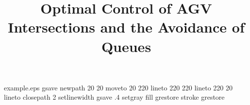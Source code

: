 %
%
%
%
%
\begin{filecontents*}{example.eps}
gsave
newpath
  20 20 moveto
  20 220 lineto
  220 220 lineto
  220 20 lineto
closepath
2 setlinewidth
gsave
  .4 setgray fill
grestore
stroke
grestore
\end{filecontents*}
%
\RequirePackage{fix-cm}
%
\documentclass[twocolumn]{svjour3}          %
%
\smartqed  %
%
\usepackage{graphicx}
%
%
\usepackage[numbers]{natbib} %
\usepackage{bm}
\usepackage{amsmath} %
%
%
%



\title{Optimal Control of AGV Intersections and the Avoidance of Queues}
\thanks{ This research was made possible thanks to the financial support of a Full-time EPSRC Doctoral Training Partnership Studentship Institute for Transpoirt Studies and also thanks to CASE partner Guidance Automation Limited. 
}


